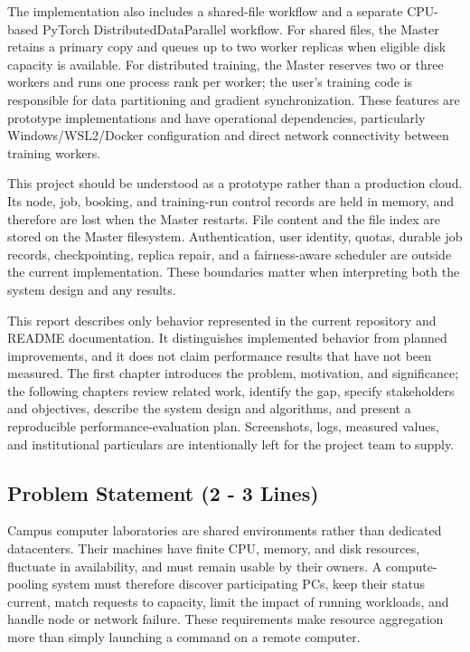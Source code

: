 \documentclass{article}
\begin{document}
The implementation also includes a shared-file workflow and a separate CPU-based PyTorch DistributedDataParallel workflow. For shared files, the Master retains a primary copy and queues up to two worker replicas when eligible disk capacity is available. For distributed training, the Master reserves two or three workers and runs one process rank per worker; the user's training code is responsible for data partitioning and gradient synchronization. These features are prototype implementations and have operational dependencies, particularly Windows/WSL2/Docker configuration and direct network connectivity between training workers.

This project should be understood as a prototype rather than a production cloud. Its node, job, booking, and training-run control records are held in memory, and therefore are lost when the Master restarts. File content and the file index are stored on the Master filesystem. Authentication, user identity, quotas, durable job records, checkpointing, replica repair, and a fairness-aware scheduler are outside the current implementation. These boundaries matter when interpreting both the system design and any results.

This report describes only behavior represented in the current repository and README documentation. It distinguishes implemented behavior from planned improvements, and it does not claim performance results that have not been measured. The first chapter introduces the problem, motivation, and significance; the following chapters review related work, identify the gap, specify stakeholders and objectives, describe the system design and algorithms, and present a reproducible performance-evaluation plan. Screenshots, logs, measured values, and institutional particulars are intentionally left for the project team to supply.

	\subsection{Problem Statement (2 - 3 Lines)}

Campus computer laboratories are shared environments rather than dedicated datacenters. Their machines have finite CPU, memory, and disk resources, fluctuate in availability, and must remain usable by their owners. A compute-pooling system must therefore discover participating PCs, keep their status current, match requests to capacity, limit the impact of running workloads, and handle node or network failure. These requirements make resource aggregation more than simply launching a command on a remote computer.
\end{document}
